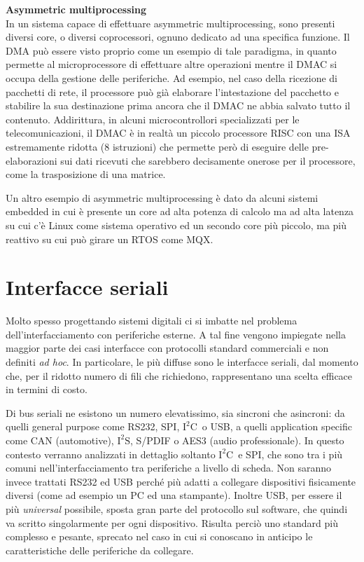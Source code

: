 \documentclass[11pt,4paper]{report}
\newcommand{\iic}{$\text{I}^2\text{C}$}
\begin{document}
\begin{tcolorbox}
\textbf{Asymmetric multiprocessing}\\
In un sistema capace di effettuare asymmetric multiprocessing, sono presenti diversi core, o diversi coprocessori, ognuno dedicato ad una specifica funzione. Il DMA può essere visto proprio come un esempio di tale paradigma, in quanto permette al microprocessore di effettuare altre operazioni mentre il DMAC si occupa della gestione delle periferiche. Ad esempio, nel caso della ricezione di pacchetti di rete, il processore può già elaborare l'intestazione del pacchetto e stabilire la sua destinazione prima ancora che il DMAC ne abbia salvato tutto il contenuto. Addirittura, in alcuni microcontrollori specializzati per le telecomunicazioni, il DMAC è in realtà un piccolo processore RISC con una ISA estremamente ridotta (8 istruzioni) che permette però di eseguire delle pre-elaborazioni sui dati ricevuti che sarebbero decisamente onerose per il processore, come la trasposizione di una matrice.

Un altro esempio di asymmetric multiprocessing è dato da alcuni sistemi embedded in cui è presente un core ad alta potenza di calcolo ma ad alta latenza su cui c'è Linux come sistema operativo ed un secondo core più piccolo, ma più reattivo su cui può girare un RTOS come MQX.
\end{tcolorbox}



\chapter{Interfacce seriali}
Molto spesso progettando sistemi digitali ci si imbatte nel problema dell'interfacciamento con periferiche esterne. A tal fine vengono impiegate nella maggior parte dei casi interfacce con protocolli standard commerciali e non definiti \emph{ad hoc}. In particolare, le più diffuse sono le interfacce seriali, dal momento che, per il ridotto numero di fili che richiedono, rappresentano una scelta efficace in termini di costo. 

Di bus seriali ne esistono un numero elevatissimo, sia sincroni che asincroni: da quelli general purpose come RS232, SPI, \iic\ o USB, a quelli application specific come CAN (automotive), $\text{I}^2\text{S}$, S/PDIF o AES3 (audio professionale). In questo contesto verranno analizzati in dettaglio soltanto \iic\ e SPI, che sono tra i più comuni nell'interfacciamento tra periferiche a livello di scheda. Non saranno invece trattati RS232 ed USB perché più adatti a collegare dispositivi fisicamente diversi (come ad esempio un PC ed una stampante). Inoltre USB, per essere il più \emph{universal} possibile, sposta gran parte del protocollo sul software, che quindi va scritto singolarmente per ogni dispositivo. Risulta perciò uno standard più complesso e pesante, sprecato nel caso in cui si conoscano in anticipo le caratteristiche delle periferiche da collegare.
\end{document}
